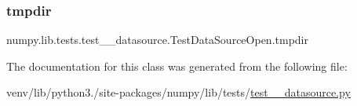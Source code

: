 \subsubsection{\texorpdfstring{tmpdir}{tmpdir}}
{\footnotesize\ttfamily numpy.\+lib.\+tests.\+test\+\_\+\+\_\+datasource.\+Test\+Data\+Source\+Open.\+tmpdir}



The documentation for this class was generated from the following file\+:\begin{DoxyCompactItemize}
\item 
venv/lib/python3./site-\/packages/numpy/lib/tests/\hyperlink{test____datasource_8py}{test\+\_\+\+\_\+datasource.\+py}\end{DoxyCompactItemize}
